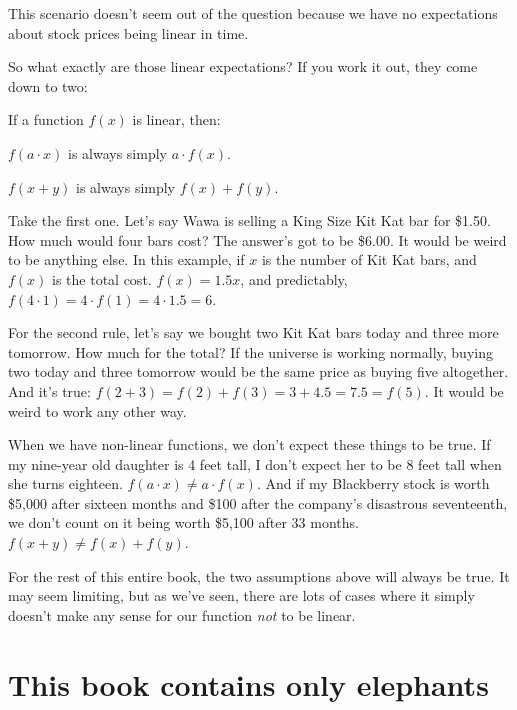 This scenario doesn't seem out of the question because we have no expectations
about stock prices being linear in time.

\medskip

So what exactly are those linear expectations? If you work it out, they come
down to two:

\begin{framed}
\label{linearExpectations}
If a function $f(x)$ is linear, then:
\begin{compactitem}
\item $f(a\cdot x)$ is always simply $a\cdot f(x)$.
\item $f(x+y)$ is always simply $f(x)+f(y)$.
\end{compactitem}
\end{framed}

Take the first one. Let's say Wawa is selling a King Size Kit Kat bar for
\$1.50. How much would four bars cost? The answer's got to be \$6.00. It would
be weird to be anything else. In this example, if $x$ is the number of Kit Kat
bars, and $f(x)$ is the total cost. $f(x) = 1.5x$, and predictably, $f(4\cdot
1) = 4 \cdot f(1) = 4 \cdot 1.5 = 6.$

For the second rule, let's say we bought two Kit Kat bars today and three more
tomorrow. How much for the total? If the universe is working normally, buying
two today and three tomorrow would be the same price as buying five altogether.
And it's true: $f(2+3) = f(2) + f(3) = 3 + 4.5 = 7.5 = f(5)$. It would be weird
to work any other way.

When we have non-linear functions, we don't expect these things to be true. If
my nine-year old daughter is 4 feet tall, I don't expect her to be 8 feet tall
when she turns eighteen. $f(a\cdot x) \neq a\cdot f(x)$. And if my Blackberry
stock is worth \$5,000 after sixteen months and \$100 after the company's
disastrous seventeenth, we don't count on it being worth \$5,100 after 33
months. $f(x+y) \neq f(x)+f(y)$.

For the rest of this entire book, the two assumptions above will always be
true. It may seem limiting, but as we've seen, there are lots of cases where it
simply doesn't make any sense for our function \textit{not} to be linear.

\section{This book contains only elephants}

